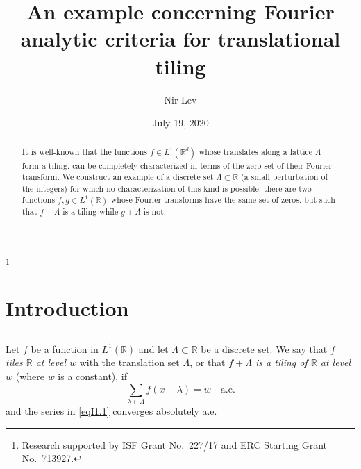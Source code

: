 \documentclass[reqno,a4paper,12pt]{amsart}
\numberwithin{equation}{section}
\numberwithin{figure}{section}
\newcommand\R{\mathbb{R}}
\newcommand\Lam{\Lambda}
\newcommand\1{\mathds{1}}
\newcommand\sbt{\subset}
\theoremstyle{plain}
\theoremstyle{definition}
\begin{document}
\title[An example concerning Fourier analytic criteria for tiling]
{An example concerning Fourier analytic criteria for translational tiling}


\author{Nir Lev}
\address{Department of Mathematics, Bar-Ilan University, Ramat-Gan 5290002, Israel}

\date{July 19, 2020}
\thanks{Research supported by ISF Grant No.\ 227/17 and ERC Starting Grant No.\ 713927.}



\begin{abstract}
It is well-known that the functions $f \in L^1(\mathbb{R}^d)$ whose translates along a lattice $\Lambda$ form a tiling, can be completely characterized in terms of the zero set of their Fourier transform. We construct an example of a discrete set $\Lambda \subset \mathbb{R}$ (a small perturbation of the integers) for which no characterization of this kind is possible: there are two functions $f, g \in L^1(\mathbb{R})$ whose Fourier transforms have the same set of zeros, but such that $f + \Lambda$ is a tiling while $g + \Lambda$ is not. 
\end{abstract}



\maketitle






\section{Introduction}


\subsection{} 
Let $f$ be a function in $L^1(\R)$ and let
$\Lam \sbt \R$ be a discrete set. 
We say that \emph{$f$ tiles $\R$
at level $w$} with the translation set $\Lam$,
or that 
\emph{$f+\Lam$ is a tiling of $\R$
at level $w$} (where $w$ is a constant), if 
\begin{equation}
\label{eqI1.1}
\sum_{\lambda\in\Lambda}f(x-\lambda)=w\quad\text{a.e.}
\end{equation}
and the series in \eqref{eqI1.1} converges absolutely a.e.
\end{document}
